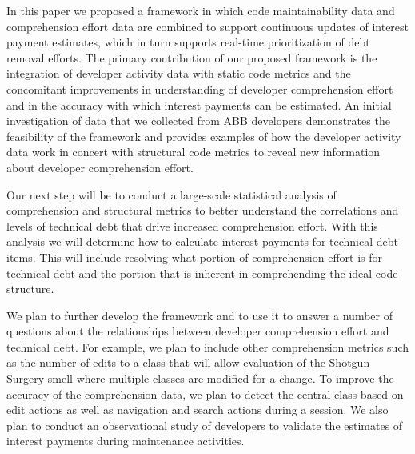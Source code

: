 In this paper we proposed a framework in which code maintainability data and comprehension effort data are combined to support continuous updates of interest payment estimates, which in turn supports real-time prioritization of debt removal efforts. The primary contribution of our proposed framework is the integration of developer activity data with static code metrics and the concomitant improvements in understanding of developer comprehension effort and in the accuracy with which interest payments can be estimated. An initial investigation of data that we collected from ABB developers demonstrates the feasibility of the framework and provides examples of how the developer activity data work in concert with structural code metrics to reveal new information about developer comprehension effort.

Our next step will be to conduct a large-scale statistical analysis of comprehension and structural metrics to better understand the correlations and levels of technical debt that drive increased comprehension effort.  With this analysis we will determine how to calculate interest payments for technical debt items.  This will include resolving what portion of comprehension effort is for technical debt and the portion that is inherent in comprehending the ideal code structure.  

We plan to further develop the framework and to use it to answer a number of questions about the relationships between developer comprehension effort and technical debt.  For example, we plan to include other comprehension metrics such as the number of edits to a class that will allow evaluation of the Shotgun Surgery smell where multiple classes are modified for a change.  To improve the accuracy of the comprehension data, we plan to detect the central class based on edit actions as well as navigation and search actions during a session.  We also plan to conduct an observational study of developers to validate the estimates  of interest payments during maintenance activities.